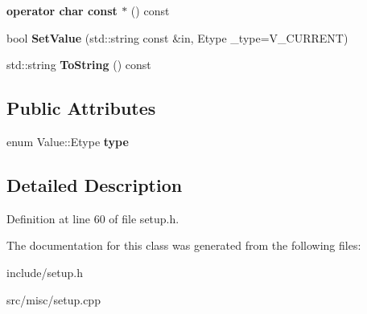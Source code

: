 \begin{DoxyCompactItemize}
\item 
\hypertarget{classValue_a34c3d3e97da4667b1ac6932b3a16fb92}{{\bfseries operator char const $\ast$} () const }\label{classValue_a34c3d3e97da4667b1ac6932b3a16fb92}

\item 
\hypertarget{classValue_a7c785d7517533757bf9b3f7a15cc4e6a}{bool {\bfseries Set\-Value} (std\-::string const \&in, Etype \-\_\-type=V\-\_\-\-C\-U\-R\-R\-E\-N\-T)}\label{classValue_a7c785d7517533757bf9b3f7a15cc4e6a}

\item 
\hypertarget{classValue_a31428e493a421f64254f84cf5fe114f1}{std\-::string {\bfseries To\-String} () const }\label{classValue_a31428e493a421f64254f84cf5fe114f1}

\end{DoxyCompactItemize}
\subsection*{Public Attributes}
\begin{DoxyCompactItemize}
\item 
\hypertarget{classValue_aa8611755fd5d52ca0e16f5cd8caed48f}{enum Value\-::\-Etype {\bfseries type}}\label{classValue_aa8611755fd5d52ca0e16f5cd8caed48f}

\end{DoxyCompactItemize}


\subsection{Detailed Description}


Definition at line 60 of file setup.\-h.



The documentation for this class was generated from the following files\-:\begin{DoxyCompactItemize}
\item 
include/setup.\-h\item 
src/misc/setup.\-cpp\end{DoxyCompactItemize}
